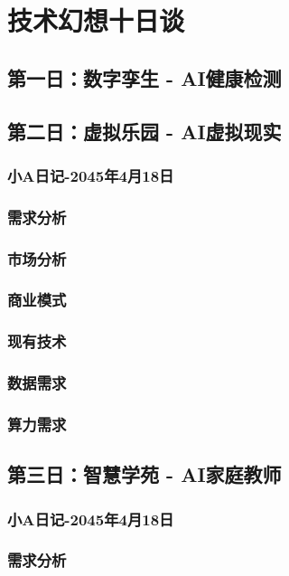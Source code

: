 \setchapterpreamble[u]{\margintoc}
\chapter{技术幻想十日谈}

\section{第一日：数字孪生 - AI健康检测}


\section{第二日：虚拟乐园 - AI虚拟现实}
\subsection{小A日记-2045年4月18日}
\subsection{需求分析}
\subsection{市场分析}
\subsection{商业模式}
\subsection{现有技术}
\subsection{数据需求}
\subsection{算力需求}

\section{第三日：智慧学苑 - AI家庭教师}
\subsection{小A日记-2045年4月18日}
\subsection{需求分析}
